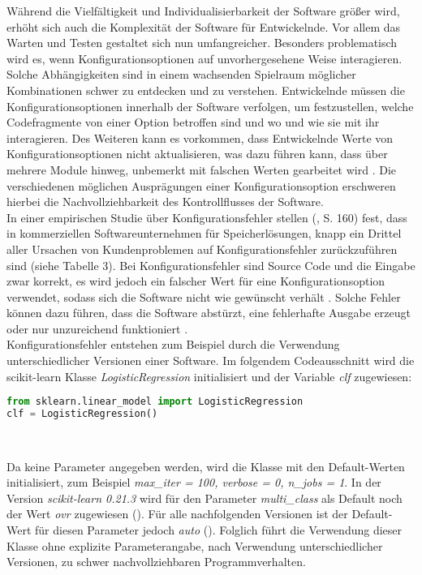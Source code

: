 \documentclass[german,bachelor]{swsLeipzig}
\begin{document}
W\"ahrend die Vielf\"altigkeit und Individualisierbarkeit der Software gr\"o\ss er wird, erh\"oht sich auch die Komplexit\"at der Software f\"ur Entwickelnde.
Vor allem das Warten und Testen gestaltet sich nun umfangreicher.
Besonders problematisch wird es, wenn Konfigurationsoptionen auf unvorhergesehene Weise interagieren.
Solche Abh\"angigkeiten sind in einem wachsenden Spielraum m\"oglicher Kombinationen schwer zu entdecken und zu verstehen.
Entwickelnde m\"ussen die Konfigurationsoptionen innerhalb der Software verfolgen, um festzustellen,
welche Codefragmente von einer Option betroffen sind und wo und wie sie mit ihr interagieren.
Des Weiteren kann es vorkommen, dass Entwickelnde Werte von Konfigurationsoptionen nicht aktualisieren, was dazu führen kann,
dass über mehrere Module hinweg, unbemerkt mit falschen Werten gearbeitet wird \cite[S. 185]{7774519}.
Die verschiedenen m\"oglichen Auspr\"agungen einer Konfigurationsoption erschweren hierbei die Nachvollziehbarkeit des Kontrollflusses der Software.\\

In einer empirischen Studie über Konfigurationsfehler stellen \citeauthor{10.1145/2043556.2043572} (\citeyear{10.1145/2043556.2043572}, S. 160) fest,
dass in kommerziellen Softwareunternehmen für Speicherlösungen, knapp ein Drittel aller Ursachen von Kundenproblemen auf Konfigurationsfehler zurückzuführen sind (siehe Tabelle 3).
Bei Konfigurationsfehler sind Source Code und die Eingabe zwar korrekt, es wird jedoch ein falscher Wert für eine Konfigurationsoption verwendet,
sodass sich die Software nicht wie gewünscht verhält \cite[S. 152]{10.1145/2568225.2568251}.
Solche Fehler können dazu führen, dass die Software abstürzt, eine fehlerhafte Ausgabe erzeugt oder nur unzureichend funktioniert \cite[S. 152]{10.1145/2568225.2568251}.\\

Konfigurationsfehler entstehen zum Beispiel durch die Verwendung unterschiedlicher Versionen einer Software.
Im folgendem Codeausschnitt wird die scikit-learn Klasse \textit{LogisticRegression} initialisiert und der Variable \textit{clf} zugewiesen:\\

\begin{lstlisting}[language=Python, frame=single]
  from sklearn.linear_model import LogisticRegression
clf = LogisticRegression()
\end{lstlisting}
\

Da keine Parameter angegeben werden, wird die Klasse mit den Default-Werten initialisiert, zum Beispiel
\textit{max\_iter = 100, verbose = 0, n\_jobs = 1}.
In der Version \textit{scikit-learn 0.21.3} wird für den Parameter \textit{multi\_class} als Default noch der Wert \textit{ovr} zugewiesen (\citeyear{sklearn}).
Für alle nachfolgenden Versionen ist der Default-Wert für diesen Parameter jedoch \textit{auto} (\citeyear{sklearn}).
Folglich führt die Verwendung dieser Klasse ohne explizite Parameterangabe, nach Verwendung unterschiedlicher Versionen, zu schwer nachvollziehbaren Programmverhalten.\\
\end{document}
